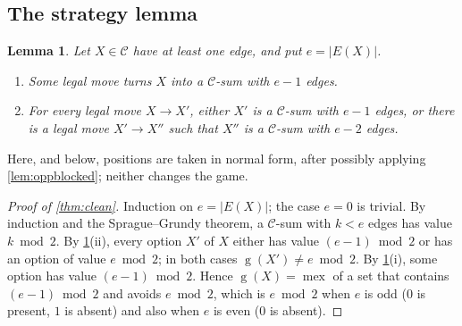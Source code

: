 \documentclass[11pt]{amsart}
\newtheorem{lemma}[theorem]{Lemma}
\theoremstyle{definition}
\theoremstyle{remark}
\newcommand{\gv}{\operatorname{g}}           %
\newcommand{\mex}{\operatorname{mex}}
\begin{document}
\subsection{The strategy lemma}

\begin{lemma}\label{lem:main}
Let $X\in\mathcal C$ have at least one edge, and put $e=|E(X)|$.
\begin{enumerate}[label=\textup{(\roman*)}]
\item Some legal move turns $X$ into a $\mathcal C$-sum with $e-1$ edges.
\item For every legal move $X\to X'$, either $X'$ is a $\mathcal C$-sum with $e-1$ edges, or
there is a legal move $X'\to X''$ such that $X''$ is a $\mathcal C$-sum with $e-2$ edges.
\end{enumerate}
\end{lemma}

Here, and below, positions are taken in normal form, after possibly applying
\cref{lem:oppblocked}; neither changes the game.

\begin{proof}[Proof of \cref{thm:clean}]
Induction on $e=|E(X)|$; the case $e=0$ is trivial. By induction and the Sprague--Grundy theorem,
a $\mathcal C$-sum with $k<e$ edges has value $k\bmod 2$. By \cref{lem:main}(ii), every option $X'$
of $X$ either has value $(e-1)\bmod 2$ or has an option of value $e\bmod 2$; in both cases
$\gv(X')\neq e\bmod 2$. By \cref{lem:main}(i), some option has value $(e-1)\bmod2$. Hence
$\gv(X)=\mex$ of a set that contains $(e-1)\bmod 2$ and avoids $e\bmod 2$, which is $e\bmod 2$
when $e$ is odd ($0$ is present, $1$ is absent) and also when $e$ is even ($0$ is absent).
\end{proof}
\end{document}
